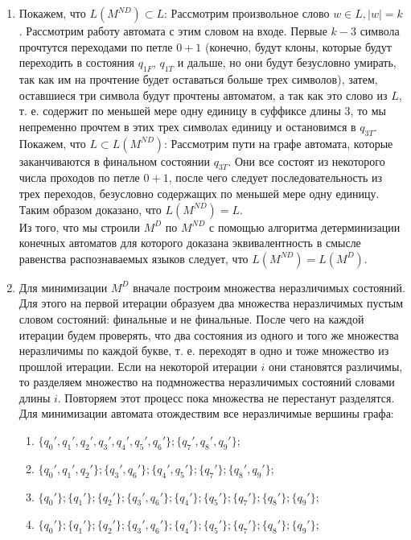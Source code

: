 \begin{enumerate}[label=(\roman{*})]
	\item
		Покажем, что $L(M^{ND}) \subset L$: Рассмотрим произвольное слово $w \in L, |w| = k$. Рассмотрим работу автомата с этим словом на входе. Первые $k-3$ символа прочтутся переходами по петле $0+1$ (конечно, будут клоны, которые будут переходить в состояния $q_{1F}$, $q_{1T}$ и дальше, но они будут безусловно умирать, так как им на прочтение будет оставаться больше трех символов), затем, оставшиеся три символа будут прочтены автоматом, а так как это слово из $L$, т. е. содержит по меньшей мере одну единицу в суффиксе длины $3$, то мы непременно прочтем в этих трех символах единицу и остановимся в $q_{3T}$.\\
		Покажем, что $L \subset L(M^{ND})$: Рассмотрим пути на графе автомата, которые заканчиваются в финальном состоянии $q_{3T}$. Они все состоят из некоторого числа проходов по петле $0+1$, после чего следует последовательность из трех переходов, безусловно содержащих по меньшей мере одну единицу.\\
		Таким образом доказано, что $L(M^{ND}) = L$.\\
		Из того, что мы строили $M^D$ по $M^{ND}$ с помощью алгоритма детерминизации конечных автоматов для которого доказана эквивалентность в смысле равенства распознаваемых языков следует, что $L(M^{ND}) = L(M^D)$.
	\item Для минимизации $M^{D}$ вначале построим множества неразличимых состояний. Для этого на первой итерации образуем два множества неразличимых пустым словом состояний: финальные и не финальные. После чего на каждой итерации будем проверять, что два состояния из одного и того же множества неразличимы по каждой букве, т. е. переходят в одно и тоже множество из прошлой итерации. Если на некоторой итерации $i$ они становятся различимы, то разделяем множество на подмножества неразличимых состояний словами длины $i$. Повторяем этот процесс пока множества не перестанут разделятся. Для минимизации автомата отождествим все неразличимые вершины графа:
		\begin{enumerate}[label=Итерация №\arabic*:]
			\item $\{q_0', q_1', q_2', q_3', q_4', q_5', q_6'\}; \{q_7', q_8', q_9'\};$
			\item $\{q_0', q_1', q_2'\}; \{q_3', q_6'\}; \{q_4', q_5'\}; \{q_7'\}; \{q_8', q_9'\};$
			\item $\{q_0'\}; \{q_1'\}; \{q_2'\}; \{q_3', q_6'\}; \{q_4'\}; \{q_5'\}; \{q_7'\}; \{q_8'\}; \{q_9'\};$
			\item $\{q_0'\}; \{q_1'\}; \{q_2'\}; \{q_3', q_6'\}; \{q_4'\}; \{q_5'\}; \{q_7'\}; \{q_8'\}; \{q_9'\};$
		\end{enumerate}
		

\end{enumerate}
